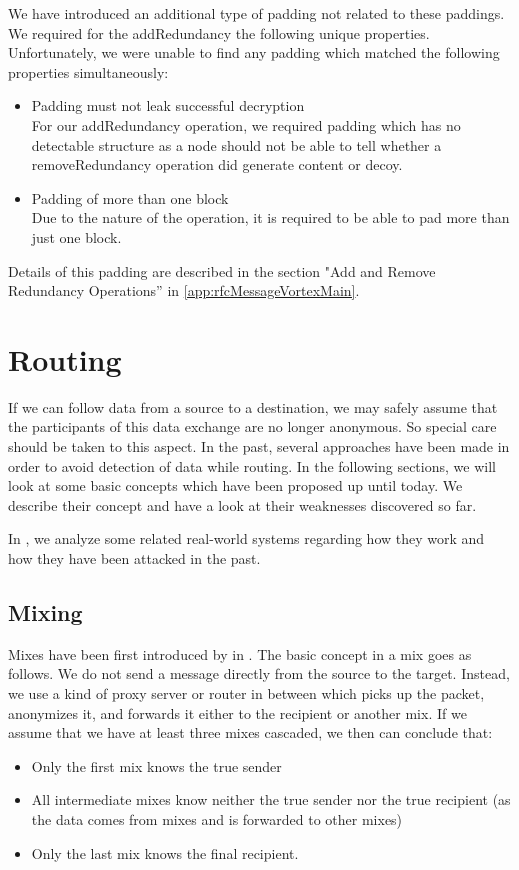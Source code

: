 We have introduced an additional type of padding not related to these paddings. We required for the addRedundancy the following unique properties. Unfortunately, we were unable to find any padding which matched the following properties simultaneously:

\begin{itemize}
	\item Padding must not leak successful decryption\\
	      For our addRedundancy operation, we required padding which has no detectable structure as a node should not be able to tell whether a removeRedundancy operation did generate content or decoy. 
	\item Padding of more than one block\\
	      Due to the nature of the operation, it is required to be able to pad more than just one block.
\end{itemize}

Details of this padding are described in the section "Add and Remove Redundancy Operations'' in \ref{app:rfcMessageVortexMain}. 

\section{Routing}

If we can follow data from a source to a destination, we may safely assume that the participants of this data exchange are no longer anonymous. So special care should be taken to this aspect. In the past, several approaches have been made in order to avoid detection of data while routing. In the following sections, we will look at some basic concepts which have been proposed up until today. We describe their concept and have a look at their weaknesses discovered so far.

In , we analyze some related real-world systems regarding how they work and how they have been attacked in the past.

\subsection{Mixing\label{sec:mixnets}}
Mixes have been first introduced by \cite{CHAUM1} in \citeyear{CHAUM1}. The basic concept in a mix goes as follows. We do not send a message directly from the source to the target. Instead, we use a kind of proxy server or router in between which picks up the packet, anonymizes it, and forwards it either to the recipient or another mix. If we assume that we have at least three mixes cascaded, we then can conclude that:
\begin{itemize}
	\item Only the first mix knows the true sender
	\item All intermediate mixes know neither the true sender nor the true recipient (as the data comes from mixes and is forwarded to other mixes) 
	\item Only the last mix knows the final recipient.
\end{itemize}

